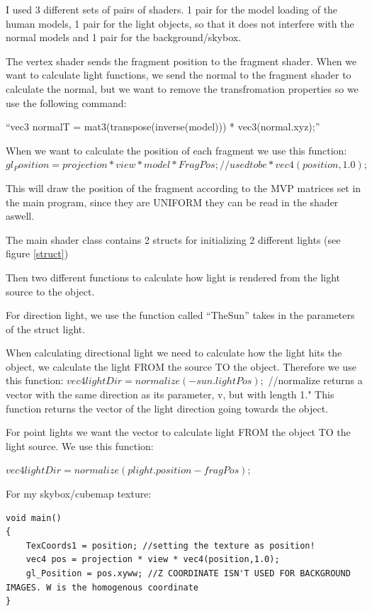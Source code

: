 \documentclass[a4paper,11pt]{article}
\begin{document}
	I used 3 different sets of pairs of shaders. 1 pair for the model loading of the human models, 1 pair for the light objects, so that it does not interfere with the normal models and 1 pair for the background/skybox.
	
	The vertex shader sends the fragment position to the fragment shader. When we want to calculate light functions, we send the normal to the fragment shader to calculate the normal, but we want to remove the transfromation properties so we use the following command: 
	
	``vec3 normalT = mat3(transpose(inverse(model))) * vec3(normal.xyz);''
	
	When we want to calculate the position of each fragment we use this function:
	  $gl_Position = projection * view * model * FragPos; //used to be *vec4(position,1.0);$
	  
	  This will draw the position of the fragment according to the MVP matrices set in the main program, since they are UNIFORM they can be read in the shader aswell.
	
	The main shader class contains 2 structs for initializing 2 different lights (see figure \ref{struct})
	
	Then two different functions to calculate how light is rendered from the light source to the object.
	
	For direction light, we use the function called ``TheSun'' takes in the parameters of the struct light.
	
	When calculating directional light we need to calculate how the light hits the object, we calculate the light FROM the source TO the object. Therefore we use this function: 
$vec4 lightDir = normalize(-sun.lightPos);$ //normalize returns a vector with the same direction as its parameter, v, but with length 1."
This function returns the vector of the light direction going towards the object.

For point lights we want the vector to calculate light FROM the object TO the light source. We use this function:

$vec4 lightDir = normalize(plight.position - fragPos); $

For my skybox/cubemap texture:

\begin{lstlisting}
void main()
{
    TexCoords1 = position; //setting the texture as position!
    vec4 pos = projection * view * vec4(position,1.0);
    gl_Position = pos.xyww; //Z COORDINATE ISN'T USED FOR BACKGROUND IMAGES. W is the homogenous coordinate
}
\end{lstlisting}
\end{document}
